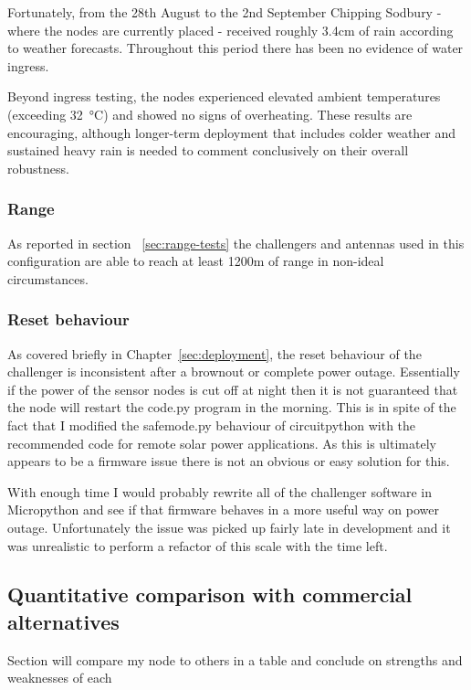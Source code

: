 Fortunately, from the 28th August to the 2nd September Chipping Sodbury - where
the nodes are currently placed - received roughly 3.4cm of rain according to
weather forecasts. Throughout this period there has been no evidence of water
ingress.

Beyond ingress testing, the nodes experienced elevated ambient temperatures
(exceeding \SI{32}{\degreeCelsius}) and showed no signs of overheating. These
results are encouraging, although longer-term deployment that includes colder
weather and sustained heavy rain is needed to comment conclusively on their
overall robustness.

\subsubsection{Range}

As reported in section ~\ref{sec:range-tests} the challengers and antennas used
in this configuration are able to reach at least 1200m of range in non-ideal
circumstances.

\subsubsection{Reset behaviour}

As covered briefly in Chapter~\ref{sec:deployment}, the reset behaviour of the
challenger is inconsistent after a brownout or complete power outage.
Essentially if the power of the sensor nodes is cut off at night then it is not
guaranteed that the node will restart the code.py program in the morning. This
is in spite of the fact that I modified the safemode.py behaviour of
circuitpython with the recommended code for remote solar power applications. As
this is ultimately appears to be a firmware issue there is not an obvious or
easy solution for this. 

With enough time I would probably rewrite all of the challenger software in
Micropython and see if that firmware behaves in a more useful way on power
outage. Unfortunately the issue was picked up fairly late in development and it
was unrealistic to perform a refactor of this scale with the time left.

\subsection{Quantitative comparison with commercial alternatives}

Section will compare my node to others in a table and conclude on strengths and
weaknesses of each
